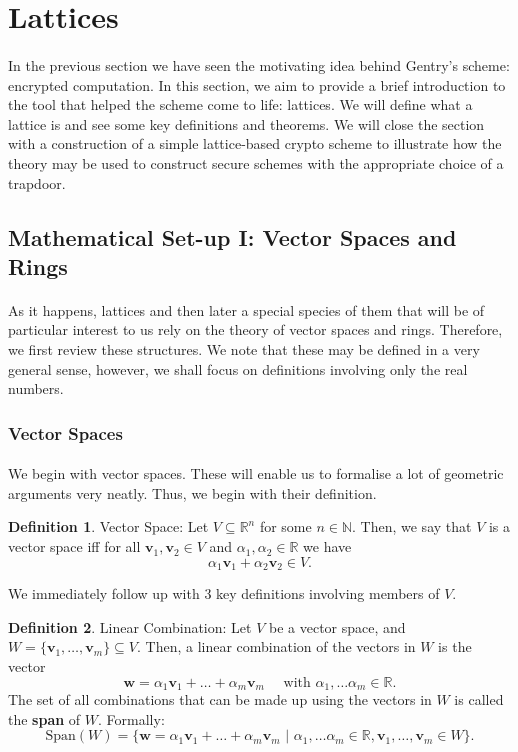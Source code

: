 \documentclass{article}
\theoremstyle{definition}
\newtheorem{definition}{Definition}[section]
\theoremstyle{example}
\newcommand{\Nat}{\mathbb{N}}
\newcommand{\Reals}{\mathbb{R}}
\newcommand{\Span}{\text{Span}}
\renewcommand{\vec}[1]{\mathbf{#1}}
\begin{document}
\section{Lattices}
\paragraph{}
In the previous section we have seen the motivating idea behind Gentry's scheme:
encrypted computation. In this section, we aim to provide a brief introduction
to the tool that helped the scheme come to life: lattices. We will define what a
lattice is and see some key definitions and theorems. We will close the section
with a construction of a simple lattice-based crypto scheme to illustrate how
the theory may be used to construct secure schemes with the appropriate choice
of a trapdoor. \cite{hoffstein2014introduction}
\subsection{Mathematical Set-up I: Vector Spaces and Rings}
\paragraph{} As it happens, lattices and then later a special species of them
that will be of particular interest to us rely on the theory of vector
spaces and rings. Therefore, we first review these structures. We note that
these may be defined in a very general sense, however, we shall focus on
definitions involving only the real numbers.
\subsubsection{Vector Spaces}
\paragraph{} We begin with vector spaces. These will enable us to formalise a
lot of geometric arguments very neatly. Thus, we begin with their definition.
\begin{definition}{Vector Space:}
  Let $V \subseteq \Reals^n$ for some $n \in \Nat$. Then, we say that $V$ is a
  vector space iff for all $\vec{v}_1, \vec{v}_2 \in V$ and $\alpha_1, \alpha_2
  \in \Reals$ we have
  \[
    \alpha_1\vec{v}_1 + \alpha_2\vec{v}_2 \in V.
  \]
\end{definition}
We immediately follow up with 3 key definitions involving members of $V$.
\begin{definition}{Linear Combination:}
  Let $V$ be a vector space, and $W = \{\vec{v}_1, \hdots, \vec{v}_m\} \subseteq
  V$. Then, a linear combination of the vectors in $W$ is the vector
  \[
    \vec{w} = \alpha_1\vec{v}_1 + \hdots + \alpha_m\vec{v}_m\quad\text{ with }
    \alpha_1, \hdots \alpha_m \in \Reals.
  \]
  The set of all combinations that can be made up using the vectors in $W$ is
  called the \textbf{span} of $W$. Formally:
  \[
    \Span(W) = \{\vec{w} = \alpha_1\vec{v}_1 + \hdots + \alpha_m\vec{v}_m
    \,\,|\,\, \alpha_1, \hdots \alpha_m \in \Reals, \vec{v}_1,\hdots, \vec{v}_m
    \in W \}.
  \]
\end{definition}
\end{document}
